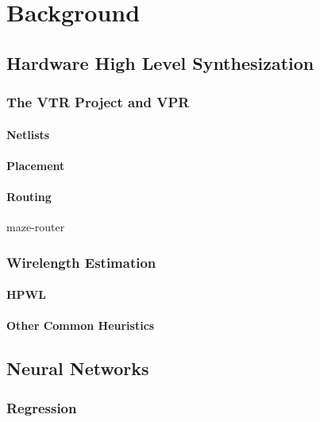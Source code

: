 
\chapter{Background}\label{ch:relatedwork}
\glsresetall %

\section{Hardware High Level Synthesization}

\subsection{The VTR Project and VPR}

\subsubsection{Netlists}

\subsubsection{Placement}

\subsubsection{Routing}

maze-router

\subsection{Wirelength Estimation}

\subsubsection{\gls{HPWL}}

\subsubsection{Other Common Heuristics}

\section{Neural Networks}

\subsection{Regression}

